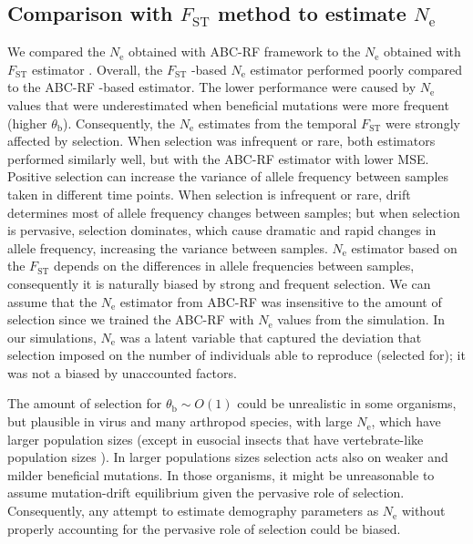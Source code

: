 \documentclass[a4paper, 12pt]{article}
\begin{document}
\subsection*{Comparison with $F_{\mathrm{ST}}$ method to estimate $N_\mathrm{e}$}

We compared the $N_{\mathrm{e}}$ obtained with ABC-RF framework to the $N_{\mathrm{e}}$ obtained with $F_{\mathrm{ST}}$ estimator \citep{Skoglund:2014ci, Frachon:2017fw}. Overall, the $F_{\mathrm{ST}}$ -based $N_{\mathrm{e}}$ estimator performed poorly compared to the ABC-RF -based estimator. The lower performance were caused by $N_{\mathrm{e}}$ values that were underestimated when beneficial mutations were more frequent (higher $\theta_{\mathrm{b}}$). Consequently, the $N_{\mathrm{e}}$ estimates from the temporal $F_{\mathrm{ST}}$ were strongly affected by selection. When selection was infrequent or rare, both estimators performed similarly well, but with the ABC-RF estimator with lower MSE. Positive selection can increase the variance of allele frequency between samples taken in different time points. When selection is infrequent or rare, drift determines most of allele frequency changes between samples; but when selection is pervasive, selection dominates, which cause dramatic and rapid changes in allele frequency, increasing the variance between samples. $N_{\mathrm{e}}$ estimator based on the $F_{\mathrm{ST}}$ depends on the differences in allele frequencies between samples, consequently it is naturally biased by strong and frequent selection. We can assume that the $N_{\mathrm{e}}$ estimator from ABC-RF was insensitive to the amount of selection since we trained the ABC-RF with $N_{\mathrm{e}}$ values from the simulation. In our simulations, $N_{\mathrm{e}}$ was a latent variable that captured the deviation that selection imposed on the number of individuals able to reproduce (selected for); it was not a biased by unaccounted factors. 

The amount of selection for $\theta_{\mathrm{b}}\sim O(1)$ could be unrealistic in some organisms, but plausible in virus \citep{Feder:2014fe} and many arthropod species, with large $N_{\mathrm{e}}$, which have larger population sizes (except in eusocial insects that have vertebrate-like population sizes \citet{Romiguier:2014dh}). In larger populations sizes selection acts also on weaker and milder beneficial mutations. In those organisms, it might be unreasonable to assume mutation-drift equilibrium given the pervasive role of selection. Consequently, any attempt to estimate demography parameters as $N_{\mathrm{e}}$ without properly accounting for the pervasive role of selection could be biased.
\end{document}
